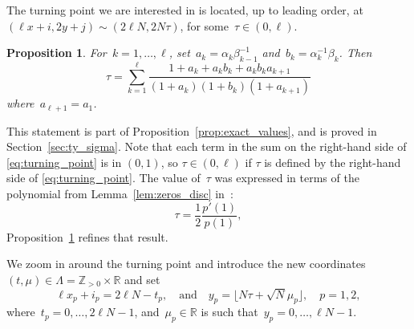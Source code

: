 \documentclass[11pt]{article}
\theoremstyle{plain}
\newtheorem{proposition}[theorem]{Proposition}
\theoremstyle{definition}
\numberwithin{equation}{section}
\newcommand{\ZZ}{\mathbb{Z}}
\newcommand{\RR}{\mathbb{R}}
\begin{document}
The turning point we are interested in is located, up to leading order, at~$(\ell x+i,2y+j)\sim (2\ell N, 2 N\tau )$, for some~$\tau \in (0,\ell)$.
\begin{proposition}\label{prop:turning_point}
For~$k=1,\dots,\ell$, set~$a_k=\alpha_k\beta_{k-1}^{-1}$ and~$b_k=\alpha_k^{-1}\beta_k$. Then
\begin{equation}\label{eq:turning_point}
\tau =
\sum_{k=1}^\ell \frac{1+a_k+a_kb_k+a_kb_ka_{k+1}}
{(1+a_k)(1+b_k)(1+a_{k+1})}
\end{equation}
where~$a_{\ell+1}=a_1$.
\end{proposition}
This statement is part of Proposition~\ref{prop:exact_values}, and is proved in Section~\ref{sec:ty_sigma}. Note that each term in the sum on the right-hand side of \eqref{eq:turning_point} is in $(0,1)$, so $\tau \in (0,\ell)$ if $\tau $ is defined by the right-hand side of \eqref{eq:turning_point}. The value of~$\tau $ was expressed in terms of the polynomial from Lemma~\ref{lem:zeros_disc} in~\cite{Ber21}:
\begin{equation}
\tau =\frac{1}{2}\frac{p'(1)}{p(1)},
\end{equation}
Proposition~\ref{prop:turning_point} refines that result. 

We zoom in around the turning point and introduce the new coordinates~$(t,\mu)\in \Lambda=\ZZ_{>0}\times \RR$ and set
\begin{equation}\label{eqn:zoom_coordinates}
\ell x_p+i_p=2\ell N-t_p, \quad \text{and} \quad y_p=\lfloor N\tau +\sqrt{N}\mu_p\rfloor, \quad p=1,2,
\end{equation}
%
where~$t_p=0,\dots,2\ell N-1$, and~$\mu_p\in \RR$ is such that~$y_p=0,\dots,\ell N-1$.
%
%
\end{document}
